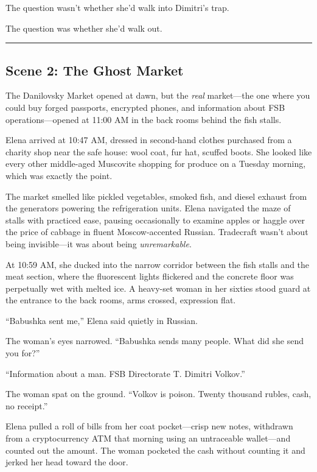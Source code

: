 \documentclass[12pt,letterpaper]{book}
\begin{document}
The question wasn't whether she'd walk into Dimitri's trap.

The question was whether she'd walk out.

\begin{center}\rule{0.5\linewidth}{0.5pt}\end{center}

\hypertarget{scene-2-the-ghost-market}{%
\subsection{Scene 2: The Ghost Market}\label{scene-2-the-ghost-market}}

The Danilovsky Market opened at dawn, but the \emph{real} market---the one where you could buy forged passports, encrypted phones, and information about FSB operations---opened at 11:00 AM in the back rooms behind the fish stalls.

Elena arrived at 10:47 AM, dressed in second-hand clothes purchased from a charity shop near the safe house: wool coat, fur hat, scuffed boots. She looked like every other middle-aged Muscovite shopping for produce on a Tuesday morning, which was exactly the point.

The market smelled like pickled vegetables, smoked fish, and diesel exhaust from the generators powering the refrigeration units. Elena navigated the maze of stalls with practiced ease, pausing occasionally to examine apples or haggle over the price of cabbage in fluent Moscow-accented Russian. Tradecraft wasn't about being invisible---it was about being \emph{unremarkable}.

At 10:59 AM, she ducked into the narrow corridor between the fish stalls and the meat section, where the fluorescent lights flickered and the concrete floor was perpetually wet with melted ice. A heavy-set woman in her sixties stood guard at the entrance to the back rooms, arms crossed, expression flat.

``Babushka sent me,'' Elena said quietly in Russian.

The woman's eyes narrowed. ``Babushka sends many people. What did she send you for?''

``Information about a man. FSB Directorate T. Dimitri Volkov.''

The woman spat on the ground. ``Volkov is poison. Twenty thousand rubles, cash, no receipt.''

Elena pulled a roll of bills from her coat pocket---crisp new notes, withdrawn from a cryptocurrency ATM that morning using an untraceable wallet---and counted out the amount. The woman pocketed the cash without counting it and jerked her head toward the door.
\end{document}
